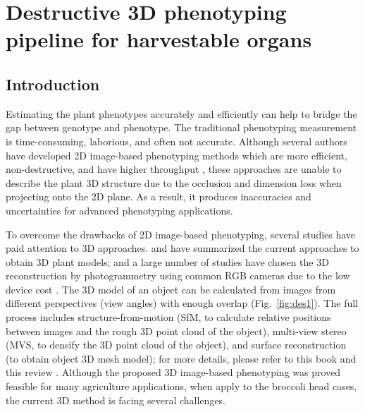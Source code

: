 \chapter{Destructive 3D phenotyping pipeline for harvestable organs}

\section{Introduction}

Estimating the plant phenotypes accurately and efficiently can help to bridge the gap between genotype and phenotype. The traditional phenotyping measurement is time-consuming, laborious, and often not accurate. Although several authors have developed 2D image-based phenotyping methods which are more efficient, non-destructive, and have higher throughput \citep{yang_greenness_2015,guo_easypcc_2017,zou_broccoli_2019}, these approaches are unable to describe the plant 3D structure due to the occlusion and dimension loss when projecting onto the 2D plane. As a result, it produces inaccuracies and uncertainties for advanced phenotyping applications.

To overcome the drawbacks of 2D image-based phenotyping, several studies have paid attention to 3D approaches. \citet{paulus_measuring_2019} and \citet{kochi_introduction_2021} have summarized the current approaches to obtain 3D plant models; and a large number of studies have chosen the 3D reconstruction by photogrammetry using common RGB cameras due to the low device cost \citep{xiao_estimating_2021,zermas_3d_2020,zhang_estimating_2016}. The 3D model of an object can be calculated from images from different perspectives (view angles) with enough overlap (Fig.~\ref{fig:des1}). The full process includes structure-from-motion (SfM, to calculate relative positions between images and the rough 3D point cloud of the object), multi-view stereo (MVS, to densify the 3D point cloud of the object), and surface reconstruction (to obtain object 3D mesh model); for more details, please refer to this book \citep{hartley_multiple_2000} and this review \citep{snavely_scene_2010}. Although the proposed 3D image-based phenotyping was proved feasible for many agriculture applications, when apply to the broccoli head cases, the current 3D method is facing several challenges.



